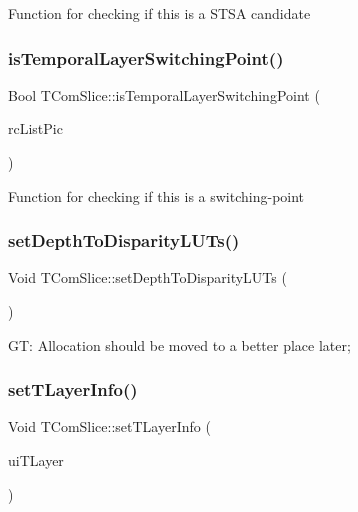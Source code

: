 Function for checking if this is a S\+T\+SA candidate \mbox{\label{class_t_com_slice_a1df3066ceffd59c19a99890f1da7dac3}} 
\subsubsection{\texorpdfstring{is\+Temporal\+Layer\+Switching\+Point()}{isTemporalLayerSwitchingPoint()}}
{\footnotesize\ttfamily Bool T\+Com\+Slice\+::is\+Temporal\+Layer\+Switching\+Point (\begin{DoxyParamCaption}\item[{\hyperlink{class_t_com_list}{T\+Com\+List}$<$ \hyperlink{class_t_com_pic}{T\+Com\+Pic} $\ast$$>$ \&}]{rc\+List\+Pic }\end{DoxyParamCaption})}

Function for checking if this is a switching-\/point \mbox{\label{class_t_com_slice_a1fa7a79ca204a2230ed23c8d339b78f7}} 
\subsubsection{\texorpdfstring{set\+Depth\+To\+Disparity\+L\+U\+Ts()}{setDepthToDisparityLUTs()}}
{\footnotesize\ttfamily Void T\+Com\+Slice\+::set\+Depth\+To\+Disparity\+L\+U\+Ts (\begin{DoxyParamCaption}{ }\end{DoxyParamCaption})}

GT\+: Allocation should be moved to a better place later; \mbox{\label{class_t_com_slice_aad39642ed9fcb4b389162c5ccf6e07de}} 
\subsubsection{\texorpdfstring{set\+T\+Layer\+Info()}{setTLayerInfo()}}
{\footnotesize\ttfamily Void T\+Com\+Slice\+::set\+T\+Layer\+Info (\begin{DoxyParamCaption}\item[{U\+Int}]{ui\+T\+Layer }\end{DoxyParamCaption})}

